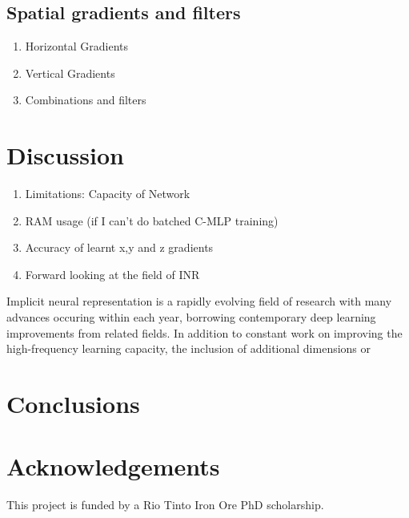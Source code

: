 \documentclass{article}
\begin{document}
\subsection{Spatial gradients and filters}
\begin{enumerate}
    \item Horizontal Gradients
    \item Vertical Gradients
    \item Combinations and filters
\end{enumerate}

\section{Discussion}
\begin{enumerate}
    \item Limitations: Capacity of Network
    \item RAM usage (if I can't do batched C-MLP training)
    \item Accuracy of learnt x,y and z gradients
    \item Forward looking at the field of INR
\end{enumerate}

Implicit neural representation is a rapidly evolving field of research with many advances occuring within each year, borrowing contemporary deep learning improvements from related fields.
In addition to constant work on improving the high-frequency learning capacity, the inclusion of additional dimensions or

\section{Conclusions}

\section{Acknowledgements}
This project is funded by a Rio Tinto Iron Ore PhD scholarship.

\printbibliography{}
\end{document}

